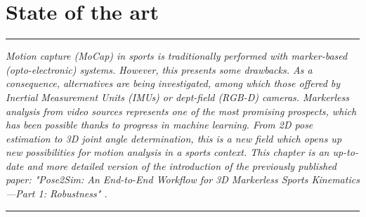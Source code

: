 
\lhead[\fancyplain{}{\leftmark}]%
      {\fancyplain{}{}} %
\chead[\fancyplain{}{}]%
      {\fancyplain{}{}}
\rhead[\fancyplain{}{}]%
      {\fancyplain{}{\rightmark}}%
\lfoot[\fancyplain{}{}]%
      {\fancyplain{}{}}
\cfoot[\fancyplain{}{\thepage}]%
      {\fancyplain{}{\thepage}} %
\rfoot[\fancyplain{}{}]%
     {\fancyplain{}{\scriptsize}}



\chapter{State of the art}
\label{ch:1}


\begin{center}
\rule{0.7\linewidth}{.5pt}
\begin{minipage}{0.7\linewidth}
\smallskip

\textit{Motion capture (MoCap) in sports is traditionally performed with marker-based (opto-electronic) systems. However, this presents some drawbacks. As a consequence, alternatives are being investigated, among which those offered by Inertial Measurement Units (IMUs) or dept-field (RGB-D) cameras. Markerless analysis from video sources represents one of the most promising prospects, which has been possible thanks to progress in machine learning. From 2D pose estimation to 3D joint angle determination, this is a new field which opens up new possibilities for motion analysis in a sports context.\newline \newline
This chapter is an up-to-date and more detailed version of the introduction of the previously published paper: "Pose2Sim: An End-to-End Workflow for 3D Markerless Sports Kinematics—Part 1: Robustness" \cite{Pagnon2021}. }

\end{minipage}
\smallskip
\rule{0.7\linewidth}{.5pt}
\end{center}

